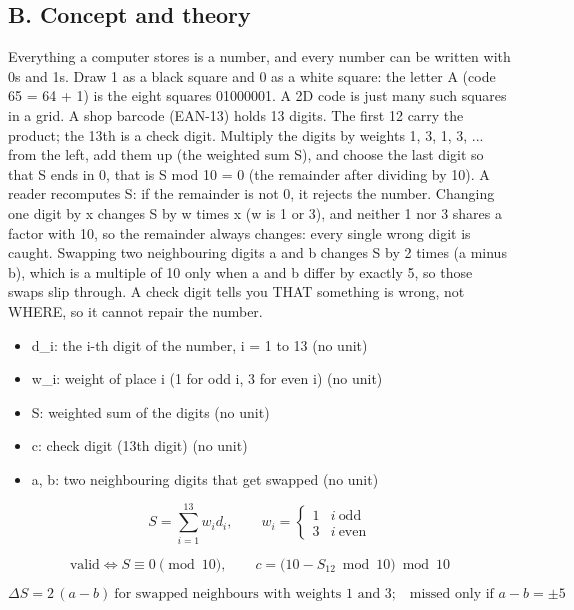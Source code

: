 \documentclass[11pt,a4paper]{article}
\begin{document}
\subsection*{B. Concept and theory}
Everything a computer stores is a number, and every number can be written with 0s and 1s. Draw 1 as a black square and 0 as a white square: the letter A (code 65 = 64 + 1) is the eight squares 01000001. A 2D code is just many such squares in a grid. A shop barcode (EAN-13) holds 13 digits. The first 12 carry the product; the 13th is a check digit. Multiply the digits by weights 1, 3, 1, 3, ... from the left, add them up (the weighted sum S), and choose the last digit so that S ends in 0, that is S mod 10 = 0 (the remainder after dividing by 10). A reader recomputes S: if the remainder is not 0, it rejects the number. Changing one digit by x changes S by w times x (w is 1 or 3), and neither 1 nor 3 shares a factor with 10, so the remainder always changes: every single wrong digit is caught. Swapping two neighbouring digits a and b changes S by 2 times (a minus b), which is a multiple of 10 only when a and b differ by exactly 5, so those swaps slip through. A check digit tells you THAT something is wrong, not WHERE, so it cannot repair the number.

\begin{itemize}[nosep]
\item d\_i: the i-th digit of the number, i = 1 to 13 (no unit)
\item w\_i: weight of place i (1 for odd i, 3 for even i) (no unit)
\item S: weighted sum of the digits (no unit)
\item c: check digit (13th digit) (no unit)
\item a, b: two neighbouring digits that get swapped (no unit)
\end{itemize}

\begin{equation*}
S=\sum_{i=1}^{13} w_i d_i,\qquad w_i=\begin{cases}1 & i\ \text{odd}\\ 3 & i\ \text{even}\end{cases}
\end{equation*}

\begin{equation*}
\text{valid}\iff S\equiv 0 \pmod{10},\qquad c=\big(10-S_{12}\bmod 10\big)\bmod 10
\end{equation*}

\begin{equation*}
\Delta S=2\,(a-b)\ \text{for swapped neighbours with weights 1 and 3;}\quad \text{missed only if } a-b=\pm 5
\end{equation*}
\end{document}
